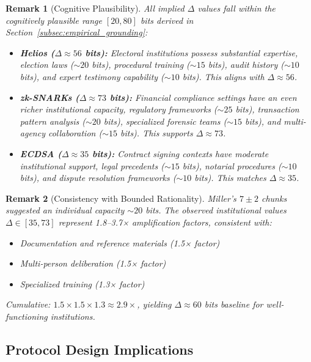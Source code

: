 \documentclass{ieeeaccess}
\newtheorem{remark}{Remark}[subsection]
\begin{document}
\begin{remark}[Cognitive Plausibility]
All implied $\Delta$ values fall within the cognitively plausible range $[20, 80]$ bits derived in Section~\ref{subsec:empirical_grounding}:
\begin{itemize}
\item \textbf{Helios ($\Delta \approx 56$ bits):} Electoral institutions possess substantial expertise, election laws ($\sim 20$ bits), procedural training ($\sim 15$ bits), audit history ($\sim 10$ bits), and expert testimony capability ($\sim 10$ bits). This aligns with $\Delta \approx 56$.

\item \textbf{zk-SNARKs ($\Delta \approx 73$ bits):} Financial compliance settings have an even richer institutional capacity, regulatory frameworks ($\sim 25$ bits), transaction pattern analysis ($\sim 20$ bits), specialized forensic teams ($\sim 15$ bits), and multi-agency collaboration ($\sim 15$ bits). This supports $\Delta \approx 73$.

\item \textbf{ECDSA ($\Delta \approx 35$ bits):} Contract signing contexts have moderate institutional support, legal precedents ($\sim 15$ bits), notarial procedures ($\sim 10$ bits), and dispute resolution frameworks ($\sim 10$ bits). This matches $\Delta \approx 35$.
\end{itemize}
\end{remark}

\begin{remark}[Consistency with Bounded Rationality]
Miller's $7\pm 2$ chunks~\cite{Miller56} suggested an individual capacity $\sim 20$ bits. The observed institutional values $\Delta \in [35, 73]$ represent 1.8--3.7× amplification factors, consistent with:
\begin{itemize}
\item Documentation and reference materials (1.5× factor)
\item Multi-person deliberation (1.5× factor)
\item Specialized training (1.3× factor)
\end{itemize}
Cumulative: $1.5 \times 1.5 \times 1.3 \approx 2.9\times$, yielding $\Delta \approx 60$ bits baseline for well-functioning institutions.
\end{remark}

\subsection{Protocol Design Implications}
\end{document}
